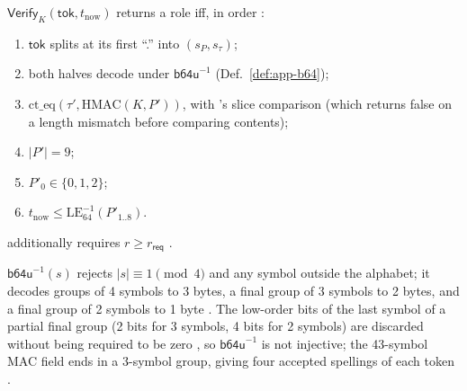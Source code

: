 \begin{definition}
\label{def:app-token-verify}
$\mathsf{Verify}_K(\mathsf{tok}, t_{\mathrm{now}})$ returns a role iff, in
order :
\begin{enumerate}
  \item[(T1)] $\mathsf{tok}$ splits at its first ``.'' into $(s_P, s_\tau)$;
  \item[(T2)] both halves decode under $\mathsf{b64u}^{-1}$
        (Def.~\ref{def:app-b64});
  \item[(T3)] $\mathrm{ct\_eq}(\tau', \mathrm{HMAC}(K,P'))$, with
        's slice comparison (which returns false on a length
        mismatch before comparing contents);
  \item[(T4)] $|P'| = 9$;
  \item[(T5)] $P'_0\in\{0,1,2\}$;
  \item[(T6)] $t_{\mathrm{now}} \le \mathrm{LE}_{64}^{-1}(P'_{1..8})$.
\end{enumerate}
 additionally requires $r\ge r_{\mathsf{req}}$
.
\end{definition}

\begin{definition}[Decoder]
\label{def:app-b64}
$\mathsf{b64u}^{-1}(s)$ rejects $|s|\equiv 1 \pmod 4$ and any symbol outside
the alphabet; it decodes groups of 4 symbols to 3 bytes, a final group of 3
symbols to 2 bytes, and a final group of 2 symbols to 1 byte
. The low-order bits of the last symbol
of a partial final group (2 bits for 3 symbols, 4 bits for 2 symbols) are
discarded without being required to be zero
, so $\mathsf{b64u}^{-1}$ is not
injective; the 43-symbol MAC field ends in a 3-symbol group, giving four
accepted spellings of each token .
\end{definition}


